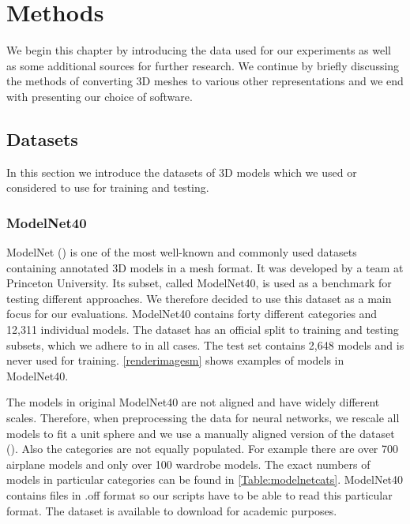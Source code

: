 \chapter{Methods}
\label{sec:chap4}
We begin this chapter by introducing the data used for our experiments as well as some additional sources for further research. We continue by briefly discussing the methods of converting 3D meshes to various other representations and we end with presenting our choice of software.

\section{Datasets}
\label{sec:dataset}
In this section we introduce the datasets of 3D models which we used or considered to use for training and testing.

\subsection{ModelNet40}
\label{sec:modelnet}
ModelNet (\cite{wu_3d_2014}) is one of the most well-known and commonly used datasets containing annotated 3D models in a mesh format. It was developed by a team at Princeton University. Its subset, called ModelNet40, is used as a benchmark for testing different approaches. We therefore decided to use this dataset as a main focus for our evaluations. ModelNet40 contains forty different categories and 12,311 individual models. The dataset has an official split to training and testing subsets, which we adhere to in all cases. The test set contains 2,648 models and is never used for training. \autoref{renderimagesm} shows examples of models in ModelNet40.\par



The models in original ModelNet40 are not aligned and have widely different scales. Therefore, when preprocessing the data for neural networks, we rescale all models to fit a  unit sphere and we use a manually aligned version of the dataset (\cite{sedaghat_orientation-boosted_2016}). Also the categories are not equally populated. For example there are over 700 airplane models and only over 100 wardrobe models. The exact numbers of models in particular categories can be found in \autoref{Table:modelnetcats}. ModelNet40 contains files in .off format so our scripts have to be able to read this particular format. The dataset is available to download for academic purposes.

